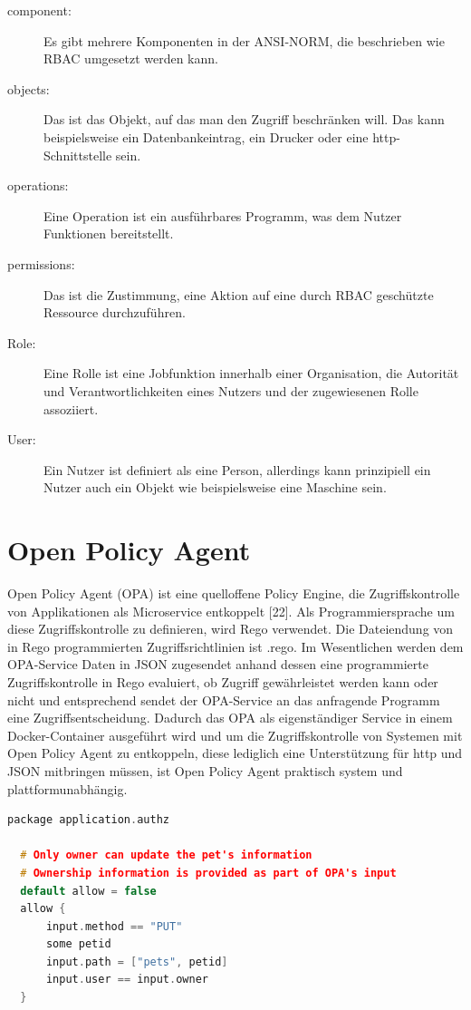\begin{description}
  \item[component:] Es gibt mehrere Komponenten in der ANSI-NORM, die beschrieben wie RBAC
  umgesetzt werden kann.
  \item[objects:] Das ist das Objekt, auf das man den Zugriff beschränken will. Das kann
  beispielsweise ein Datenbankeintrag, ein Drucker oder eine http-Schnittstelle sein.
  \item[operations:] Eine Operation ist ein ausführbares Programm, was dem Nutzer Funktionen
  bereitstellt.
  \item[permissions:] Das ist die Zustimmung, eine Aktion auf eine durch RBAC geschützte 
  Ressource durchzuführen.
  \item[Role:] Eine Rolle ist eine Jobfunktion innerhalb einer Organisation, die Autorität und 
  Verantwortlichkeiten eines Nutzers und der zugewiesenen Rolle assoziiert.
  \item[User:] Ein Nutzer ist definiert als eine Person, allerdings kann prinzipiell ein Nutzer auch ein 
  Objekt wie beispielsweise eine Maschine sein.
\end{description}

\section{Open Policy Agent}
\label{sec:OpenPolicyAgent}
Open Policy Agent (OPA) ist eine quelloffene Policy Engine, die Zugriffskontrolle von 
Applikationen als Microservice entkoppelt [22]. 
Als Programmiersprache um diese Zugriffskontrolle zu definieren, wird Rego verwendet. 
Die Dateiendung von in Rego programmierten Zugriffsrichtlinien ist .rego. 
Im Wesentlichen werden dem OPA-Service Daten in JSON zugesendet anhand dessen eine 
programmierte Zugriffskontrolle in Rego evaluiert, ob Zugriff gewährleistet werden kann 
oder nicht und entsprechend sendet der OPA-Service an das anfragende Programm eine 
Zugriffsentscheidung. Dadurch das OPA als eigenständiger Service in einem Docker-Container ausgeführt wird und um die Zugriffskontrolle von Systemen mit Open Policy 
Agent zu entkoppeln, diese lediglich eine Unterstützung für http und JSON mitbringen 
müssen, ist Open Policy Agent praktisch system und plattformunabhängig.

\begin{lstlisting}[language=C++,frame=tb,caption={Zugriffsrichtlinie in Rego},label=lst:ZugriffsrichtlinieinRego]
  package application.authz

  # Only owner can update the pet's information
  # Ownership information is provided as part of OPA's input
  default allow = false
  allow {
      input.method == "PUT"
      some petid
      input.path = ["pets", petid]
      input.user == input.owner
  }
\end{lstlisting}

